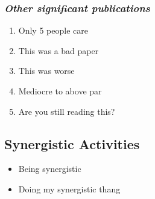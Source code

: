 \subsubsection{\textit{Other significant publications}}
\begin{enumerate}
\item Only 5 people care
\item This was a bad paper
\item This was worse
\item Mediocre to above par
\item Are you still reading this?
\end{enumerate}

\subsection{Synergistic Activities}
\begin{itemize}
\item Being synergistic
\item Doing my synergistic thang
\end{itemize}
